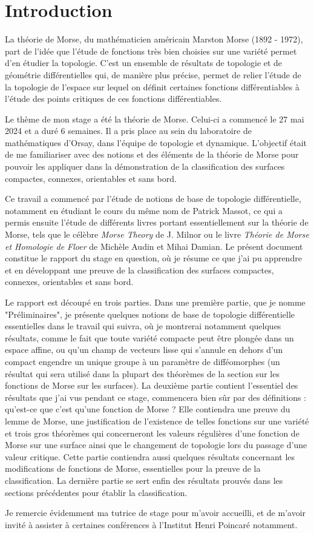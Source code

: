 \section{Introduction}
La théorie de Morse, du mathématicien américain 
Marston Morse (1892 - 1972), part de l'idée que 
l'étude de fonctions très bien choisies sur une 
variété permet d'en étudier la topologie. 
C'est un ensemble de résultats de topologie et 
de géométrie différentielles qui, de manière 
plus précise, permet de relier l'étude de la 
topologie de l'espace sur lequel on définit 
certaines fonctions différentiables à l'étude 
des points critiques de ces fonctions différentiables.


Le thème de mon stage a été la théorie de Morse. 
Celui-ci a commencé le 27 mai 2024 et a duré 6 semaines.
Il a pris place au sein du laboratoire de mathématiques 
d'Orsay,  dans l'équipe de topologie et dynamique.
L'objectif était de me familiariser avec des notions et 
des éléments de la théorie de Morse pour pouvoir les 
appliquer dans la démonstration de la classification des 
surfaces compactes, connexes, orientables et sans bord.

Ce travail a commencé par l'étude de notions de base de 
topologie différentielle, notamment en étudiant le cours 
du même nom de Patrick Massot, ce qui a permis ensuite 
l'étude de différents livres portant essentiellement sur 
la théorie de Morse, tels que le célèbre \textit{Morse Theory} 
de J. Milnor ou le livre \textit{Théorie de Morse et Homologie de Floer} 
de Michèle Audin et Mihai Damian. Le présent document 
constitue le rapport du stage en question, où je résume 
ce que j'ai pu apprendre et en développant une preuve de 
la classification des surfaces compactes, connexes, orientables 
et sans bord.


Le rapport est découpé en trois parties.  Dans une première 
partie, que je nomme "Préliminaires", je présente quelques 
notions de base de topologie différentielle essentielles 
dans le travail qui suivra, où je montrerai notamment quelques 
résultats, comme le fait que toute variété compacte peut être 
plongée dans un espace affine, ou qu'un champ de vecteurs lisse 
qui s'annule en dehors d'un compact engendre un unique groupe 
à un paramètre de difféomorphes (un résultat qui sera utilisé 
dans la plupart des théorèmes de la section sur les fonctions 
de Morse sur les surfaces). La deuxième partie contient l'essentiel 
des résultats que j'ai vus pendant ce stage, commencera bien sûr 
par des définitions : qu'est-ce que c'est qu'une fonction de Morse ? 
Elle contiendra une preuve du lemme de Morse, une justification de 
l'existence de telles fonctions sur une variété et trois gros théorèmes 
qui concerneront les valeurs régulières d'une fonction de Morse sur une 
surface ainsi que le changement de topologie lors du passage d'une valeur 
critique.  Cette partie contiendra aussi quelques résultats concernant
les modifications de fonctions de Morse, essentielles pour la preuve de 
la classification. La dernière partie se sert enfin des résultats prouvés 
dans les sections précédentes pour établir la classification.


Je remercie évidemment ma tutrice de stage pour m'avoir accueilli, et 
de m'avoir invité à assister à certaines conférences à l'Institut Henri 
Poincaré notamment.

